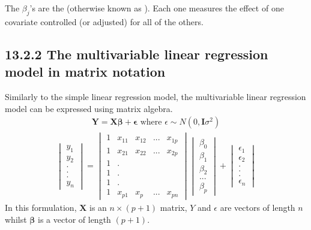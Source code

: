 \documentclass[letterpaper,10pt,english]{jupyterBook}
\begin{document}
\sphinxAtStartPar
The \(\beta_j\)’s are the  (otherwise known as ). Each one measures the effect of one covariate controlled (or adjusted) for all of the others.


\subsection{13.2.2 The multivariable linear regression model in matrix notation}
\label{\detokenize{13.c. Linear Regression II:the-multivariable-linear-regression-model-in-matrix-notation}}
\sphinxAtStartPar
Similarly to the simple linear regression model, the multivariable linear regression model can be expressed using matrix algebra.
\begin{equation*}
\begin{split}
\mathbf{Y}=\mathbf{X}\mathbf{\beta}+\mathbf{\epsilon} \text{ where }\epsilon \sim N(0,\mathbf{I}\sigma^2)
\end{split}
\end{equation*}\begin{equation*}
\begin{split}
\begin{vmatrix}y_1\\y_2 \\. \\. \\. \\y_n \end{vmatrix}=\begin{vmatrix}1 & x_{11} & x_{12} & ... & x_{1p} \\ 1 & x_{21} & x_{22} & ... & x_{2p}  \\1 & . \\1 & .  \\ 1& . \\1 & x_{p1} & x_{p} & ... & x_{pn} \end{vmatrix}\begin{vmatrix} \beta_0 \\ \beta_1 \\ \beta_2 \\ ... \\ \beta_p \end{vmatrix}+\begin{vmatrix}\epsilon_1\\ \epsilon_2 \\ . \\ . \\. \\ \epsilon_n \end{vmatrix} 
\end{split}
\end{equation*}
\sphinxAtStartPar
In this formulation, \(\mathbf{X}\) is an \(n \times (p+1)\) matrix, \(Y\) and \(\epsilon\) are vectors of length \(n\) whilst \(\mathbf{\beta}\) is a vector of length \((p+1)\).
\end{document}
